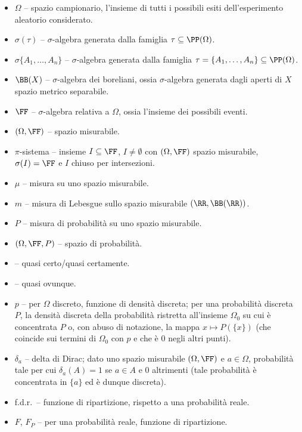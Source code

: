\begin{multicols*}{2}
    \begin{itemize}
        \item $\Omega$ -- spazio campionario, l'insieme di tutti i possibili esiti dell'esperimento aleatorio considerato.
        \item $\sigma(\tau)$ -- $\sigma$-algebra generata dalla famiglia $\tau \subseteq \PP(\Omega)$.
        \item $\sigma\{A_1, \ldots, A_n\}$ -- $\sigma$-algebra generata dalla famiglia
        $\tau = \{A_1, \ldots, A_n\} \subseteq \PP(\Omega)$.
        \item $\BB(X)$ -- $\sigma$-algebra dei boreliani, ossia $\sigma$-algebra generata dagli aperti di $X$ spazio metrico separabile.
        \item $\FF$ -- $\sigma$-algebra relativa a $\Omega$, ossia l'insieme dei possibili eventi.
        \item $(\Omega, \FF)$ -- spazio misurabile.
        \item $\pi$-sistema -- insieme $I \subseteq \FF$, $I \neq \emptyset$ con $(\Omega, \FF)$ spazio misurabile, $\sigma(I) = \FF$ e $I$ chiuso per intersezioni.
        \item $\mu$ -- misura su uno spazio misurabile.
        \item $m$ -- misura di Lebesgue sullo spazio misurabile $(\RR, \BB(\RR))$.
        \item $P$ -- misura di probabilità su uno spazio misurabile.
        \item $(\Omega, \FF, P)$ -- spazio di probabilità.
        \item \qc -- quasi certo/quasi certamente.
        \item \qo -- quasi ovunque.
        \item $p$ -- per $\Omega$ discreto, funzione di densità discreta; per una probabilità discreta $P$, la densità discreta della probabilità
        ristretta all'insieme $\Omega_0$ su cui è concentrata $P$ o, con abuso di notazione, la mappa $x \mapsto P(\{x\})$ (che coincide
        sui termini di $\Omega_0$ con $p$ e che è $0$ negli altri punti).
        \item $\delta_a$ -- delta di Dirac; dato uno spazio misurabile $(\Omega, \FF)$ e $a \in \Omega$, probabilità tale per cui
        $\delta_a(A) = 1$ se $a \in A$ e $0$ altrimenti (tale probabilità è concentrata in $\{a\}$ ed è dunque
        discreta).
        \item f.d.r.~-- funzione di ripartizione, rispetto a una probabilità reale.
        \item $F$, $F_P$ -- per una probabilità reale, funzione di ripartizione.

\end{itemize}
\end{multicols*}
